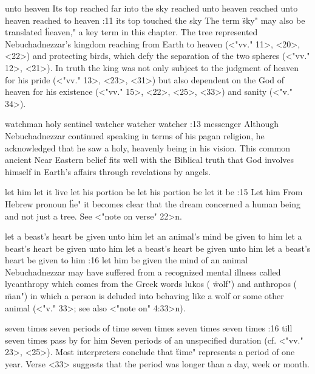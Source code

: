     {unto heaven} %
    {Its top reached far into the sky} %
    {reached unto heaven} %
    {reached unto heaven} %
    {reached to heaven} %
:11 {its top touched the sky} The term \"sky" may also be
translated \"heaven," a key term in this chapter. The tree represented Nebuchadnezzar's kingdom
reaching from Earth to heaven (<"vv." 11>, <20>, <22>) and protecting birds, which defy the separation of
the two spheres (<"vv." 12>, <21>). In truth the king was not only subject to the judgment of heaven for
his pride (<"vv." 13>, <23>, <31>) but also dependent on the God of heaven for his existence
(<"vv." 15>, <22>, <25>, <33>) and sanity (<"v." 34>).  


    {watchman} %
    {holy sentinel} %
    {watcher} %
    {watcher} %
    {watcher} %
:13 {messenger} Although Nebuchadnezzar continued speaking in terms of his pagan religion, he
acknowledged that he saw a holy, heavenly being in his vision. This common ancient Near Eastern
belief fits well with the Biblical truth that God involves himself in Earth's affairs through
revelations by angels.

    {let him} %
    {let it live} %
    {let his portion be} %
    {let his portion be} %
    {let it be} %
:15 {Let him} From Hebrew pronoun \"he" it becomes clear that the dream concerned a human being and
not just a tree. See <"note on verse" 22>n.

    {let a beast's heart be given unto him} %
    {let an animal's mind be given to him} %
    {let a beast's heart be given unto him} %
    {let a beast's heart be given unto him} %
    {let a beast's heart be given to him} %
:16 {let him be given the mind of an animal} Nebuchadnezzar
may have suffered from a recognized mental illness called lycanthropy which comes from the Greek
words lukos ( \"wolf") and anthropos ( \"man") in which a person is deluded into behaving like a wolf
or some other animal (<"v." 33>; see also <"note on" 4:33>n).

    {seven times} %
    {seven periods of time} %
    {seven times} %
    {seven times} %
    {seven times} %
:16 {till seven times pass by for him} Seven periods
of an unspecified duration (cf. <"vv." 23>, <25>). Most interpreters conclude that \"time" represents a
period of one year. Verse <33> suggests that the period was longer than a day, week or month.

